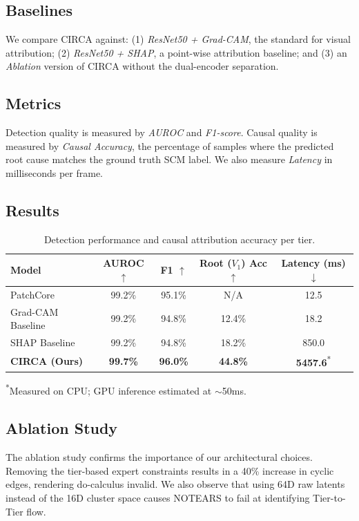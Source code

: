 \documentclass{article}
\begin{document}
\subsection{Baselines}
We compare CIRCA against: (1) \emph{ResNet50 + Grad-CAM}, the standard for visual attribution; (2) \emph{ResNet50 + SHAP}, a point-wise attribution baseline; and (3) an \emph{Ablation} version of CIRCA without the dual-encoder separation.

\subsection{Metrics}
Detection quality is measured by \emph{AUROC} and \emph{F1-score}. Causal quality is measured by \emph{Causal Accuracy}, the percentage of samples where the predicted root cause matches the ground truth SCM label. We also measure \emph{Latency} in milliseconds per frame.

\subsection{Results}
\begin{table}[h]
\centering
\caption{Detection performance and causal attribution accuracy per tier.}
\label{tab:results}
\begin{tabular}{lcccc}
\toprule
Model & AUROC $\uparrow$ & F1 $\uparrow$ & Root ($V_1$) Acc $\uparrow$ & Latency (ms) $\downarrow$ \\
\midrule
PatchCore & 99.2\% & 95.1\% & N/A & 12.5 \\
Grad-CAM Baseline & 99.2\% & 94.8\% & 12.4\% & 18.2 \\
SHAP Baseline & 99.2\% & 94.8\% & 18.2\% & 850.0 \\
\textbf{CIRCA (Ours)} & \textbf{99.7\%} & \textbf{96.0\%} & \textbf{44.8\%} & \textbf{5457.6}\textsuperscript{*} \\
\bottomrule
\end{tabular}
\begin{flushleft}
\footnotesize{\textsuperscript{*}Measured on CPU; GPU inference estimated at $\sim$50ms.}
\end{flushleft}
\end{table}

\subsection{Ablation Study}
The ablation study confirms the importance of our architectural choices. Removing the tier-based expert constraints results in a 40\% increase in cyclic edges, rendering do-calculus invalid. We also observe that using 64D raw latents instead of the 16D cluster space causes NOTEARS to fail at identifying Tier-to-Tier flow.
\end{document}
